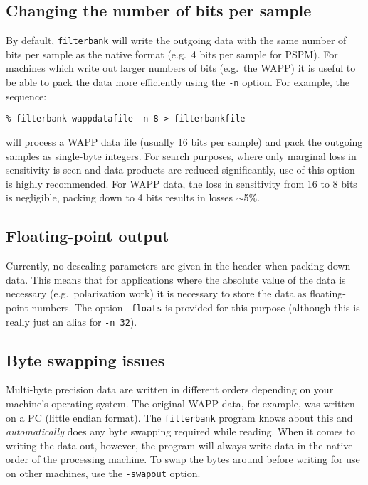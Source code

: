 \documentclass[11pt]{article}
\begin{document}
\subsection*{Changing the number of bits per sample}
By default, {\tt filterbank} will write the outgoing data with the same
number of bits per sample as the native format (e.g.~4 bits per sample
for PSPM). For machines which write out larger numbers of bits
(e.g.~the WAPP) it is useful to be able to pack the data more
efficiently using the {\tt -n} option.  For example, the sequence:
\begin{verbatim}
% filterbank wappdatafile -n 8 > filterbankfile
\end{verbatim}
will process a WAPP data file (usually 16 bits per sample) and
pack the outgoing samples as single-byte integers. For search
purposes, where only marginal loss in sensitivity is seen and data products
are reduced significantly, use of this option is highly recommended.
For WAPP data, the loss in sensitivity from 16 to 8 bits is negligible,
packing down to 4 bits results in losses $\sim$5\%.

\subsection*{Floating-point output}
Currently, no descaling parameters are given in the header when
packing down data. This means that for applications where the
absolute value of the data is necessary (e.g.~polarization work)
it is necessary to store the data as floating-point numbers.
The option {\tt -floats} is provided for this purpose (although this
is really just an alias for {\tt -n 32}).

\subsection*{Byte swapping issues}
Multi-byte precision data are written in different orders depending on
your machine's operating system. The original WAPP data, for example,
was written on a PC (little endian format).  The {\tt filterbank}
program knows about this and {\sl automatically} does any byte
swapping required while reading. When it comes to writing the data
out, however, the program will always write data in the native order
of the processing machine.  To swap the bytes around before writing
for use on other machines, use the {\tt -swapout} option.
\end{document}
